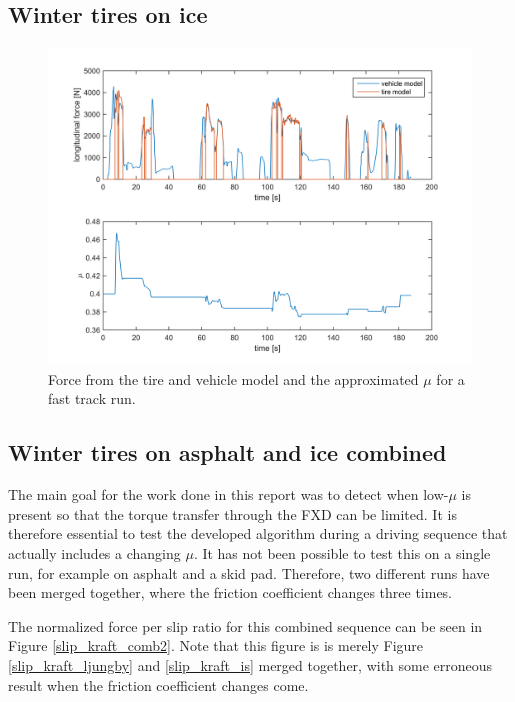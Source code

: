 \subsection{Winter tires on ice}

\begin{figure}[h]
	\centering
	\includegraphics[width=1.0\textwidth]{Pictures/force_mue_ice_normal}
	\caption {Force from the tire and vehicle model and the approximated $ \mu $ for a fast track run.}
	\label{force_mue_ice_normal}
\end{figure}

\subsection{Winter tires on asphalt and ice combined}
The main goal for the work done in this report was to detect when low-$ \mu $ is present so that the torque transfer through the FXD can be limited. It is therefore essential to test the developed algorithm during a driving sequence that actually includes a changing $ \mu $. It has not been possible to test this on a single run, for example on asphalt and a skid pad. Therefore, two different runs have been merged together, where the friction coefficient changes three times.

The normalized force per slip ratio for this combined sequence can be seen in Figure \ref{slip_kraft_comb2}. Note that this figure is is merely Figure \ref{slip_kraft_ljungby} and \ref{slip_kraft_is} merged together, with some erroneous result when the friction coefficient changes come. 

